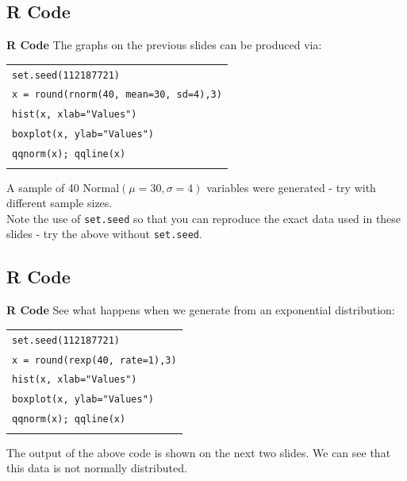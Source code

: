 \documentclass[compress]{beamer}        %
\makeatletter
\newcommand{\tcb}{\textcolor{beamer@blendedblue}}
\makeatother
\begin{document}
\subsection{R Code}
\begin{frame}{\bf \tcb{R Code}}
The graphs on the previous slides can be produced via:\\[0.5cm]

\begin{tabular}{|l|}
\hline
\texttt{set.seed(112187721)} \\
\texttt{x = round(rnorm(40, mean=30, sd=4),3)} \\
\texttt{hist(x, xlab="Values")} \\
\texttt{boxplot(x, ylab="Values")} \\
\texttt{qqnorm(x); qqline(x)} \\
\hline
\multicolumn{1}{c}{}\\[0.2cm]
\end{tabular}

A sample of 40 Normal$(\mu=30,\sigma=4)$ variables were generated - try with different sample sizes.\\[0.3cm]

Note the use of \texttt{set.seed} so that you can reproduce the exact data used in these slides - try the above without \texttt{set.seed}.

\end{frame}





\subsection{R Code}
\begin{frame}{\bf \tcb{R Code}}
See what happens when we generate from an exponential distribution:\\[0.5cm]


\begin{tabular}{|l|}
\hline
\texttt{set.seed(112187721)} \\
\texttt{x = round(rexp(40, rate=1),3)} \\
\texttt{hist(x, xlab="Values")} \\
\texttt{boxplot(x, ylab="Values")} \\
\texttt{qqnorm(x); qqline(x)} \\
\hline
\multicolumn{1}{c}{}\\[0.2cm]
\end{tabular}

The output of the above code is shown on the next two slides. We can see that this data is not normally distributed.

\end{frame}
\end{document}
